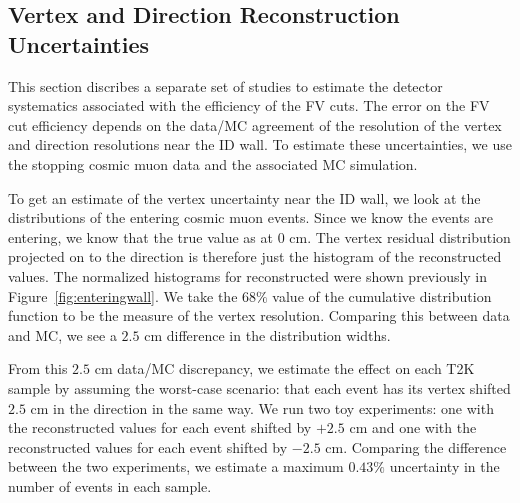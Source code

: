 \subsection{Vertex and Direction Reconstruction Uncertainties}
\label{subsec:vtxunc}

This section discribes a separate set of studies to estimate the detector
systematics associated with the efficiency of the FV cuts.  The error on the FV
cut efficiency depends on the data/MC agreement of the resolution of the vertex
and direction resolutions near the ID wall.  To estimate these uncertainties,
we use the stopping cosmic muon data and the associated MC simulation.  

To get an estimate of the vertex uncertainty near the ID wall, we look at the
\wall distributions of the entering cosmic muon events.  Since we know the
events are entering, we know that the true \wall value as at $0$ cm.  The
vertex residual distribution projected on to the \wall direction is therefore just the
histogram of the reconstructed \wall values.  The normalized histograms for
reconstructed \wall were shown previously in Figure~\ref{fig:enteringwall}.  We
take the $68\%$ value of the cumulative distribution function
to be the measure of the vertex resolution.  Comparing this between data
and MC, we see a $2.5$ cm difference in the distribution widths.  

From this $2.5$ cm data/MC discrepancy, we estimate the effect on each T2K
sample by assuming the worst-case scenario: that each event has its vertex shifted
$2.5$ cm in the \wall direction in the same way.  We run two toy experiments: one with
the reconstructed \wall values for each event shifted by $+2.5$ cm and one 
with the reconstructed \wall values for each event shifted by $-2.5$
cm.  Comparing the difference between the two experiments, we estimate a
maximum $0.43\%$ uncertainty in the number of events in each sample. 


